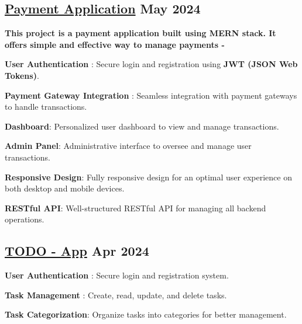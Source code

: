 \subsection{{\href{https://github.com/mrsamirr/payment-application}{Payment Application} \hfill May 2024}}
\begin{zitemize}
\item {\textbf{This project is a payment application built using MERN stack. It offers simple and effective way to manage payments -}}
\item {\textbf{User Authentication}} : Secure login and registration using {\textbf{JWT (JSON Web Tokens)}}.
\item {\textbf{Payment Gateway Integration}} : Seamless integration with payment gateways to handle transactions.
\item {\textbf{Dashboard}}: Personalized user dashboard to view and manage transactions.
\item {\textbf{Admin Panel}}: Administrative interface to oversee and manage user transactions.
\item {\textbf{Responsive Design}}: Fully responsive design for an optimal user experience on both desktop and mobile devices.
\item {\textbf{RESTful API}}: Well-structured RESTful API for managing all backend operations.

\end{zitemize}


\subsection{{\href{https://github.com/mrsamirr/todo-app}{TODO - App} \hfill Apr 2024 }}
\begin{zitemize}
\item {\textbf{User Authentication}} : Secure login and registration system.
\item {\textbf{Task Management}} : Create, read, update, and delete tasks.
\item {\textbf{Task Categorization}}: Organize tasks into categories for better management.


\end{zitemize}

